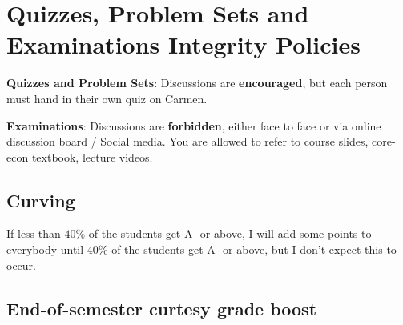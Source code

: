 \documentclass[12pt]{article}
\begin{document}
\section*{Quizzes, Problem Sets and Examinations Integrity Policies}

\textbf{Quizzes and Problem Sets}: Discussions are \textbf{encouraged}, but each person must hand in their own quiz on Carmen.

\textbf{Examinations}: Discussions are \textbf{forbidden}, either face to face or via online discussion board / Social media. You are allowed to refer to course slides, core-econ textbook, lecture videos.



\subsection*{Curving}

If less than $40\%$ of the students get A- or above, I will add some points to everybody until $40\%$ of the students get A- or above, but I don’t expect this to occur.



\subsection*{End-of-semester curtesy grade boost}
\label{sub:End_of_semester_curtesy_grade_boost}
\end{document}
